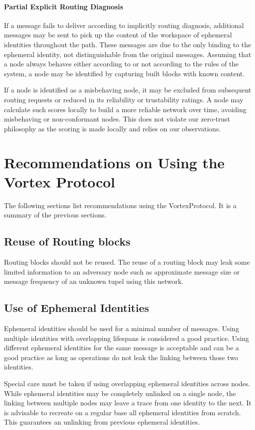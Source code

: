 \subsubsection{Partial Explicit Routing Diagnosis}
If a message fails to deliver according to implicitly routing diagnosis, additional messages may be sent to pick up the content of the workspace of ephemeral identities throughout the path. These messages are due to the only binding to the ephemeral identity, not distinguishable from the original messages. Assuming that a node always behaves either according to or not according to the rules of the system, a node may be identified by capturing built blocks with known content.

If a node is identified as a misbehaving node, it may be excluded from subsequent routing requests or reduced in its reliability or trustability ratings. A node may calculate such scores locally to build a more reliable network over time, avoiding misbehaving or non-conformant nodes. This does not violate our zero-trust philosophy as the scoring is made locally and relies on our observations.

\chapter{Recommendations on Using the Vortex Protocol}
The following sections list recommendations using the VortexProtocol. It is a summary of the previous sections.

\section{Reuse of Routing blocks\label{sec:reuseRB}}
Routing blocks should not be reused. The reuse of a routing block may leak some limited information to an adversary node such as approximate message size or message frequency of an unknown tupel using this network.

\section{Use of Ephemeral Identities}
Ephemeral identities should be used for a minimal number of messages. Using multiple identities with overlapping lifespans is considered a good practice. Using different ephemeral identities for the same message is acceptable and can be a good practice as long as operations do not leak the linking between those two identities.

Special care must be taken if using overlapping ephemeral identities across nodes. While ephemeral identities may be completely unlinked on a single node, the linking between multiple nodes may leave a trace from one identity to the next. It is advisable to recreate on a regular base all ephemeral identities from scratch. This guarantees an unlinking from previous ephemeral identities.


